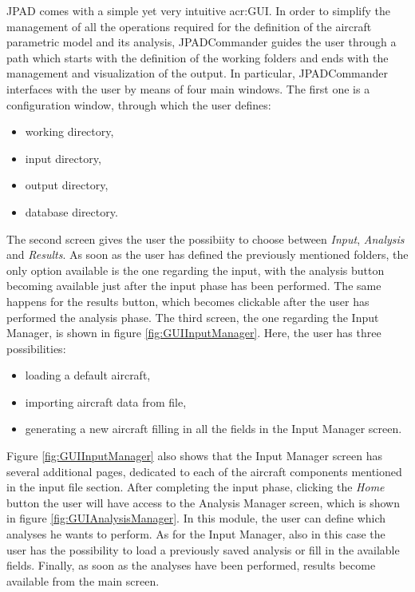 \bigskip
\noindent
\gls{JPAD} comes with a simple yet very intuitive \gls{acr:GUI}. In order to simplify the management of all the operations required for the definition of the aircraft parametric model and its analysis, JPADCommander guides the user through a path which starts with the definition of the working folders and ends with the management and visualization of the output. In particular, JPADCommander interfaces with the user by means of four main windows. The first one is a configuration window, through which the user defines:
%
\begin{itemize}
\item working directory,
\item input directory,
\item output directory,
\item database directory.
\end{itemize}
%
The second screen gives the user the possibiity to choose between \emph{Input}, \emph{Analysis} and \emph{Results}. As soon as the user has defined the previously mentioned folders, the only option available is the one regarding the input, with the analysis button becoming available just after the input phase has been performed. The same happens for the results button, which becomes clickable after the user has performed the analysis phase. The third screen, the one regarding the Input Manager, is shown in figure \ref{fig:GUIInputManager}. Here, the user has three possibilities:
%
\begin{itemize}
\item loading a default aircraft,
\item importing aircraft data from file,
\item generating a new aircraft filling in all the fields in the Input Manager screen.
\end{itemize}
%
Figure \ref{fig:GUIInputManager} also shows that the Input Manager screen has several additional pages, dedicated to each of the aircraft components mentioned in the input file section. After completing the input phase, clicking the \emph{Home} button the user will have access to the Analysis Manager screen, which is shown in figure \ref{fig:GUIAnalysisManager}. In this module, the user can define which analyses he wants to perform. As for the Input Manager, also in this case the user has the possibility to load a previously saved analysis or fill in the available fields. Finally, as soon as the analyses have been performed, results become available from the main screen.
%
